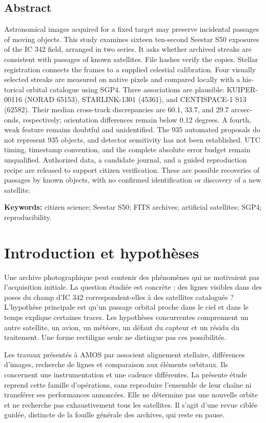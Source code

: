 \documentclass[11pt,letterpaper]{article}
\begin{document}
\begin{otherlanguage}{english}
\section*{Abstract}
Astronomical images acquired for a fixed target may preserve incidental passages of moving objects.
This study examines sixteen ten-second Seestar S50 exposures of the IC 342 field, arranged in two series.
It asks whether archived streaks are consistent with passages of known satellites.
File hashes verify the copies. Stellar registration connects the frames to a supplied celestial calibration.
Four visually selected streaks are measured on native pixels and compared locally with a historical orbital catalogue using SGP4.
Three associations are plausible: KUIPER-00116 (NORAD 65153), STARLINK-1301 (45361), and CENTISPACE-1 S13 (62582).
Their median cross-track discrepancies are 60.1, 33.7, and 29.7 arcseconds, respectively; orientation differences remain below 0.12 degrees.
A fourth, weak feature remains doubtful and unidentified.
The 935 automated proposals do not represent 935 objects, and detector sensitivity has not been established.
UTC timing, timestamp convention, and the complete absolute error budget remain unqualified.
Authorized data, a candidate journal, and a guided reproduction recipe are released to support citizen verification.
These are possible recoveries of passages by known objects, with no confirmed identification or discovery of a new satellite.
\end{otherlanguage}
\par\smallskip
\noindent\textbf{Keywords:} citizen science; Seestar S50; FITS archives; artificial satellites; SGP4; reproducibility.

\section{Introduction et hypothèses}
Une archive photographique peut contenir des phénomènes qui ne motivaient pas l’acquisition initiale.
La question étudiée est concrète : des lignes visibles dans des poses du champ d’IC 342 correspondent-elles à des satellites catalogués ?
L’hypothèse principale est qu’un passage orbital proche dans le ciel et dans le temps explique certaines traces.
Les hypothèses concurrentes comprennent un autre satellite, un avion, un météore, un défaut du capteur et un résidu du traitement.
Une forme rectiligne seule ne distingue pas ces possibilités.

Les travaux présentés à AMOS par \textcite{rood} associent alignement stellaire, différences d’images, recherche de lignes et comparaison aux éléments orbitaux.
Ils concernent une instrumentation et une cadence différentes.
La présente étude reprend cette famille d’opérations, sans reproduire l’ensemble de leur chaîne ni transférer ses performances annoncées.
Elle ne détermine pas une nouvelle orbite et ne recherche pas exhaustivement tous les satellites.
Il s’agit d’une revue ciblée guidée, distincte de la fouille générale des archives, qui reste en pause.
\end{document}
